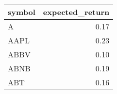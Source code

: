 \begin{tabular}{lr}
\toprule
symbol & expected\_return \\
\midrule
A & 0.17 \\
AAPL & 0.23 \\
ABBV & 0.10 \\
ABNB & 0.19 \\
ABT & 0.16 \\
\bottomrule
\end{tabular}
